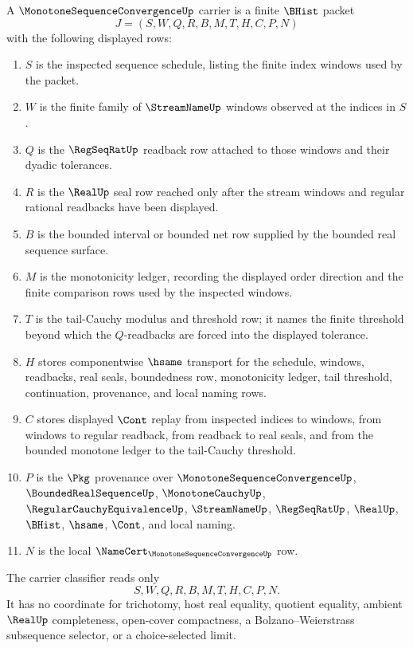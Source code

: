 \begin{definition}
\label{def:monotone-sequence-convergence-carrier}
A $\MonotoneSequenceConvergenceUp$ carrier is a finite $\BHist$ packet
$$
J=(S,W,Q,R,B,M,T,H,C,P,N)
$$
with the following displayed rows:
\begin{enumerate}
\item $S$ is the inspected sequence schedule, listing the finite index windows used by the packet.
\item $W$ is the finite family of $\StreamNameUp$ windows observed at the indices in $S$.
\item $Q$ is the $\RegSeqRatUp$ readback row attached to those windows and their dyadic tolerances.
\item $R$ is the $\RealUp$ seal row reached only after the stream windows and regular rational readbacks have been displayed.
\item $B$ is the bounded interval or bounded net row supplied by the bounded real sequence surface.
\item $M$ is the monotonicity ledger, recording the displayed order direction and the finite comparison rows used by the inspected windows.
\item $T$ is the tail-Cauchy modulus and threshold row; it names the finite threshold beyond which the $Q$-readbacks are forced into the displayed tolerance.
\item $H$ stores componentwise $\hsame$ transport for the schedule, windows, readbacks, real seals, boundedness row, monotonicity ledger, tail threshold, continuation, provenance, and local naming rows.
\item $C$ stores displayed $\Cont$ replay from inspected indices to windows, from windows to regular readback, from readback to real seals, and from the bounded monotone ledger to the tail-Cauchy threshold.
\item $P$ is the $\Pkg$ provenance over $\MonotoneSequenceConvergenceUp$, $\BoundedRealSequenceUp$, $\MonotoneCauchyUp$, $\RegularCauchyEquivalenceUp$, $\StreamNameUp$, $\RegSeqRatUp$, $\RealUp$, $\BHist$, $\hsame$, $\Cont$, and local naming.
\item $N$ is the local $\NameCert_{\MonotoneSequenceConvergenceUp}$ row.
\end{enumerate}
The carrier classifier reads only
$$
S,W,Q,R,B,M,T,H,C,P,N.
$$
It has no coordinate for trichotomy, host real equality, quotient equality, ambient $\RealUp$ completeness, open-cover compactness, a Bolzano--Weierstrass subsequence selector, or a choice-selected limit.
\end{definition}

